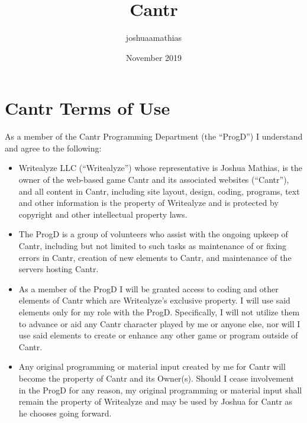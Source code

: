 \documentclass{article}
\title{Cantr}
\author{joshuaamathias}
\date{November 2019}
\begin{document}
\section*{Cantr Terms of Use}

\thispagestyle{empty} 

As a member of the Cantr Programming Department (the ``ProgD'') I understand and agree to the following:

\begin{itemize}
\item Writealyze LLC (``Writealyze'') whose representative is Joshua Mathias, is the owner of the web-based game Cantr and its associated websites (``Cantr''), and all content in Cantr, including site layout, design, coding, programs, text and other information is the property of Writealyze and is protected by copyright and other intellectual property laws.
\item The ProgD is a group of volunteers who assist with the ongoing upkeep of Cantr, including but not limited to such tasks as maintenance of or fixing errors in Cantr, creation of new elements to Cantr, and maintenance of the servers hosting Cantr.
\item As a member of the ProgD I will be granted access to coding and other elements of Cantr which are Writealyze's exclusive property. I will use said elements only for my role with the ProgD. Specifically, I will not utilize them to advance or aid any Cantr character played by me or anyone else, nor will I use said elements to create or enhance any other game or program outside of Cantr.
\item Any original programming or material input created by me for Cantr will become the property of Cantr and its Owner(s). Should I cease involvement in the ProgD for any reason, my original programming or material input shall remain the property of Writealyze and may be used by Joshua for Cantr as he chooses going forward.
\end{itemize}
\end{document}
